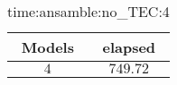 \begin{table}[!ht]
	\centering
	\begin{tabular}{|c|c|}
		\hline
		Models & elapsed \\ \hline
		$4$ & $749.72$ \\ \hline
	\end{tabular}
	\caption{time:ansamble:no_TEC:4}
	\label{tab:time:ansamble:no_TEC:4}
\end{table}
